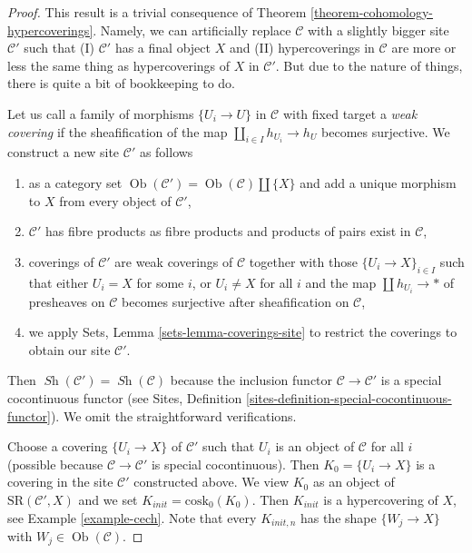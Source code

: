 \documentclass[10pt,a4paper]{amsart}
\theoremstyle{plain}
\theoremstyle{definition}
\theoremstyle{remark}
\numberwithin{equation}{subsection}
\def\Ob{\mathop{\mathrm{Ob}}\nolimits}
\def\Sh{\mathop{\mathit{Sh}}\nolimits}
\begin{document}
\begin{proof}
This result is a trivial consequence of
Theorem \ref{theorem-cohomology-hypercoverings}.
Namely, we can artificially replace $\mathcal{C}$ with a slightly
bigger site $\mathcal{C}'$ such that
(I) $\mathcal{C}'$ has a final object $X$ and (II)
hypercoverings in $\mathcal{C}$ are more or less the
same thing as hypercoverings of $X$ in $\mathcal{C}'$.
But due to the nature of things, there is quite a bit of
bookkeeping to do.

\medskip\noindent
Let us call a family of morphisms $\{U_i \to U\}$ in $\mathcal{C}$
with fixed target a {\it weak covering} if the sheafification of the
map $\coprod_{i \in I} h_{U_i} \to h_U$ becomes surjective.
We construct a new site $\mathcal{C}'$ as follows
\begin{enumerate}
\item as a category set $\Ob(\mathcal{C}') = \Ob(\mathcal{C}) \amalg \{X\}$
and add a unique morphism to $X$ from every object of $\mathcal{C}'$,
\item $\mathcal{C}'$ has fibre products as fibre products and products
of pairs exist in $\mathcal{C}$,
\item coverings of $\mathcal{C}'$ are weak coverings of $\mathcal{C}$
together with those $\{U_i \to X\}_{i \in I}$ such that either $U_i = X$
for some $i$, or $U_i \not = X$ for all $i$ and the map
$\coprod h_{U_i} \to *$ of presheaves on $\mathcal{C}$ becomes
surjective after sheafification on $\mathcal{C}$,
\item we apply Sets, Lemma \ref{sets-lemma-coverings-site}
to restrict the coverings to obtain our site $\mathcal{C}'$.
\end{enumerate}
Then $\Sh(\mathcal{C}') = \Sh(\mathcal{C})$ because the inclusion
functor $\mathcal{C} \to \mathcal{C}'$ is a special cocontinuous functor
(see Sites, Definition \ref{sites-definition-special-cocontinuous-functor}).
We omit the straightforward verifications.

\medskip\noindent
Choose a covering $\{U_i \to X\}$ of $\mathcal{C}'$ such that $U_i$ is an
object of $\mathcal{C}$ for all $i$ (possible because
$\mathcal{C} \to \mathcal{C}'$ is special cocontinuous).
Then $K_0 = \{U_i \to X\}$ is a covering in the
site $\mathcal{C}'$ constructed above. We view $K_0$ as an object of
$\text{SR}(\mathcal{C}', X)$ and we set $K_{init} = \text{cosk}_0(K_0)$.
Then $K_{init}$ is a hypercovering of $X$, see
Example \ref{example-cech}. Note that every $K_{init, n}$ has the shape
$\{W_j \to X\}$ with $W_j \in \Ob(\mathcal{C})$.


\end{proof}
\end{document}
